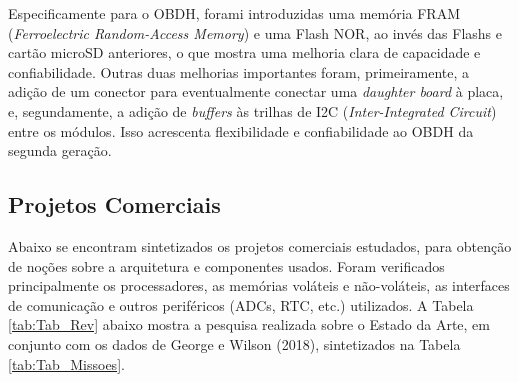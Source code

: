 Especificamente para o OBDH, forami introduzidas uma memória FRAM (\textit{Ferroelectric Random-Access Memory}) e uma Flash NOR, ao invés das Flashs e cartão microSD anteriores, o que mostra uma melhoria clara de capacidade e confiabilidade. Outras duas melhorias importantes foram, primeiramente, a adição de um conector para eventualmente conectar uma \textit{daughter board} à placa, e, segundamente, a adição de \textit{buffers} às trilhas de I2C (\textit{Inter-Integrated Circuit}) entre os módulos. Isso acrescenta flexibilidade e confiabilidade ao OBDH da segunda geração.

\subsection{Projetos Comerciais}

Abaixo se encontram sintetizados os projetos comerciais estudados, para obtenção de noções sobre a arquitetura e componentes usados. Foram verificados principalmente os processadores, as memórias voláteis e não-voláteis, as interfaces de comunicação e outros periféricos (ADCs, RTC, etc.) utilizados. A Tabela \ref{tab:Tab_Rev} abaixo mostra a pesquisa realizada sobre o Estado da Arte, em conjunto com os dados de George e Wilson (2018), sintetizados na Tabela \ref{tab:Tab_Missoes}.


